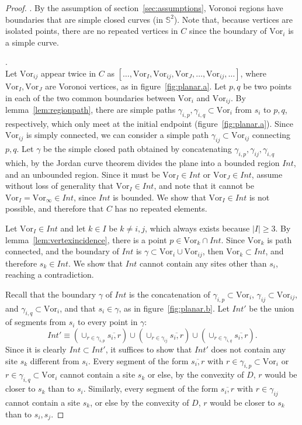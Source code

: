 \documentclass[11pt]{article}
\newcommand{\Vor}{\text{Vor}}
\begin{document}
\begin{proof}
\vspace*{0.05in}. 
By the assumption of section~\ref{sec:assumptions}, 
	Voronoi regions have boundaries that are simple closed curves (in $\mathbb{S}^2$). 
Note that, because vertices are isolated points, there are no repeated vertices in $C$ since the boundary of $\Vor_i$ is a simple curve. 


\vspace*{0.05in}. \\
Let $\Vor_{ij}$ appear twice in $C$ as $\left[\dots, \Vor_I, \Vor_{ij}, \Vor_J, \dots, \Vor_{ij}, \dots\right]$, 
where $\Vor_I,\Vor_J$ are Voronoi vertices, as in figure~\ref{fig:planar.a}. 
Let $p,q$ be two points in each of the two common boundaries between $\Vor_i$ and $\Vor_{ij}$. 
By lemma~\ref{lem:regionpath}, there are simple paths $\gamma_{i,p},\gamma_{i,q}\subset\Vor_i$ from $s_i$ to $p,q$, respectively, 
	which only meet at the initial endpoint (figure~\ref{fig:planar.a}). 
Since $\Vor_{ij}$ is simply connected, we can consider a simple path $\gamma_{ij}\subset\Vor_{ij}$ connecting $p,q$. 
Let $\gamma$ be the simple closed path obtained by concatenating $\gamma_{i,p},\gamma_{ij},\gamma_{i,q}$ 
	which, by the Jordan curve theorem divides the plane into a bounded region $Int$, and an unbounded region. 
Since it must be $\Vor_I\in Int$ or $\Vor_J\in Int$, 
	assume without loss of generality that $\Vor_I\in Int$, and note that it cannot be $\Vor_I=\Vor_\infty\in Int$, 
	since $Int$ is bounded. 
We show that $\Vor_I\in Int$ is not possible, 
	and therefore that $C$ has no repeated elements.

Let $\Vor_I\in Int$ and let $k\in I$ be $k\ne i,j$, which always exists because $|I|\ge 3$. 
By lemma~\ref{lem:vertexincidence}, there is a point $p\in\Vor_k\cap Int$. 
Since $\Vor_k$ is path connected, and the boundary of $Int$ is $\gamma\subset\Vor_{i}\cup\Vor_{ij}$, then $\Vor_k\subset Int$, 
	and therefore $s_k\in Int$. 
We show that $Int$ cannot contain any sites other than $s_i$, reaching a contradiction.  

Recall that the boundary $\gamma$ of $Int$ is the concatenation of 
	$\gamma_{i,p}\subset\Vor_i$, $\gamma_{ij}\subset\Vor_{ij}$, and $\gamma_{i,q}\subset\Vor_i$, 
	and that $s_i\in\gamma$, as in figure~\ref{fig:planar.b}. 
Let $Int'$ be the union of segments from $s_i$ to every point in $\gamma$:
\[ Int'\equiv \displaystyle{\left(\cup_{r\in\gamma_{i,p}} \overline{s_i, r}\right) \cup
				     \left(\cup_{r\in\gamma_{ij}} \overline{s_i, r}\right) \cup
				     \left(\cup_{r\in\gamma_{i,q}}\overline{s_i,r}\right)}. \]
Since it is clearly $Int\subset Int'$, it suffices to show that $Int'$ does not contain any site $s_k$ different from $s_i$.
Every segment of the form $\overline{s_i,r}$ 
	with $r\in\gamma_{i,p}\subset\Vor_i$ or $r\in\gamma_{i,q}\subset\Vor_i$ cannot contain a site $s_k$ 
	or else, by the convexity of $D$, $r$ would be closer to $s_k$ than to $s_i$. 
Similarly, every segment of the form $\overline{s_i,r}$ with 
	$r\in\gamma_{ij}$ cannot contain a site $s_k$, or else by the convexity of $D$, $r$ would be closer to $s_k$ than to $s_i,s_j$. 
	


\end{proof}
\end{document}
